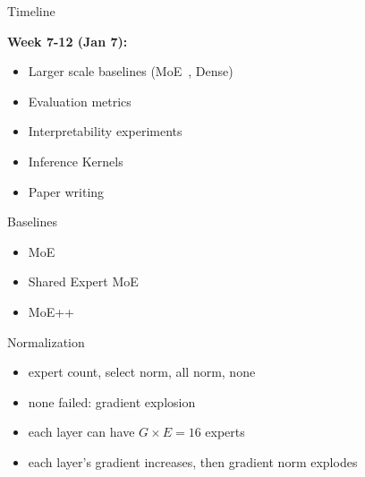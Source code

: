 \documentclass{beamer}
\begin{document}
\begin{frame}{Timeline}

\textbf{Week 7-12 (Jan 7):} 

\begin{itemize}
    \item Larger scale baselines (MoE~\cite{tan2024scattermoe, gale2023megablocks}, Dense)
    \item Evaluation metrics 
    \item Interpretability experiments
    \item Inference Kernels
    \item Paper writing
\end{itemize}

\end{frame}

\begin{frame}{Baselines}

\begin{itemize}
    \item MoE~\cite{tan2024scattermoe, gale2023megablocks}
    \item Shared Expert MoE~\cite{dai2024deepseek}
    \item MoE++~\cite{jin2024moe++}
\end{itemize}
\end{frame}

\begin{frame}{Normalization}

\begin{itemize}
    \item expert count, select norm, all norm, none
    \item none failed: gradient explosion
    \item each layer can have $G \times E = 16$ experts
    \item each layer's gradient increases, then gradient norm explodes
\end{itemize}
\end{frame}

\end{document}
